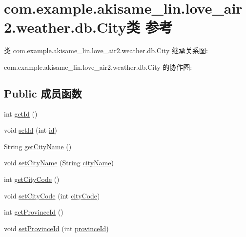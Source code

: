 \hypertarget{classcom_1_1example_1_1akisame__lin_1_1love__air2_1_1weather_1_1db_1_1_city}{}\section{com.\+example.\+akisame\+\_\+lin.\+love\+\_\+air2.\+weather.\+db.\+City类 参考}
\label{classcom_1_1example_1_1akisame__lin_1_1love__air2_1_1weather_1_1db_1_1_city}


类 com.\+example.\+akisame\+\_\+lin.\+love\+\_\+air2.\+weather.\+db.\+City 继承关系图\+:


com.\+example.\+akisame\+\_\+lin.\+love\+\_\+air2.\+weather.\+db.\+City 的协作图\+:
\subsection*{Public 成员函数}
\begin{DoxyCompactItemize}
\item 
int \mbox{\hyperlink{classcom_1_1example_1_1akisame__lin_1_1love__air2_1_1weather_1_1db_1_1_city_ad4329945a74bd58f917df02481f5cd5f}{get\+Id}} ()
\item 
void \mbox{\hyperlink{classcom_1_1example_1_1akisame__lin_1_1love__air2_1_1weather_1_1db_1_1_city_a801e908681b8951816e3b1aad2a6e022}{set\+Id}} (int \mbox{\hyperlink{classcom_1_1example_1_1akisame__lin_1_1love__air2_1_1weather_1_1db_1_1_city_a8d6e31822c7759b7ffe718ac62918097}{id}})
\item 
String \mbox{\hyperlink{classcom_1_1example_1_1akisame__lin_1_1love__air2_1_1weather_1_1db_1_1_city_a8e5fc4edf06eaf9d85469d4ff033d31b}{get\+City\+Name}} ()
\item 
void \mbox{\hyperlink{classcom_1_1example_1_1akisame__lin_1_1love__air2_1_1weather_1_1db_1_1_city_a27e86761ac655b2764825f3eca9248b6}{set\+City\+Name}} (String \mbox{\hyperlink{classcom_1_1example_1_1akisame__lin_1_1love__air2_1_1weather_1_1db_1_1_city_ad92abb8ecea043b7c701f24763bb9f90}{city\+Name}})
\item 
int \mbox{\hyperlink{classcom_1_1example_1_1akisame__lin_1_1love__air2_1_1weather_1_1db_1_1_city_a3ea1f698abf66851282a7624599d85b2}{get\+City\+Code}} ()
\item 
void \mbox{\hyperlink{classcom_1_1example_1_1akisame__lin_1_1love__air2_1_1weather_1_1db_1_1_city_a01d955c419301512e95602a84b2cbd24}{set\+City\+Code}} (int \mbox{\hyperlink{classcom_1_1example_1_1akisame__lin_1_1love__air2_1_1weather_1_1db_1_1_city_a40a6d9685a5ef5eb07c072eee49dfc5f}{city\+Code}})
\item 
int \mbox{\hyperlink{classcom_1_1example_1_1akisame__lin_1_1love__air2_1_1weather_1_1db_1_1_city_a761618984f0f9730198bec104cd9b0a9}{get\+Province\+Id}} ()
\item 
void \mbox{\hyperlink{classcom_1_1example_1_1akisame__lin_1_1love__air2_1_1weather_1_1db_1_1_city_ac4d4a96b607937bb0f51ff7a564f1b8a}{set\+Province\+Id}} (int \mbox{\hyperlink{classcom_1_1example_1_1akisame__lin_1_1love__air2_1_1weather_1_1db_1_1_city_a15d55e5fa5b3247f2e3eb86bbbd4ceb1}{province\+Id}})
\end{DoxyCompactItemize}
